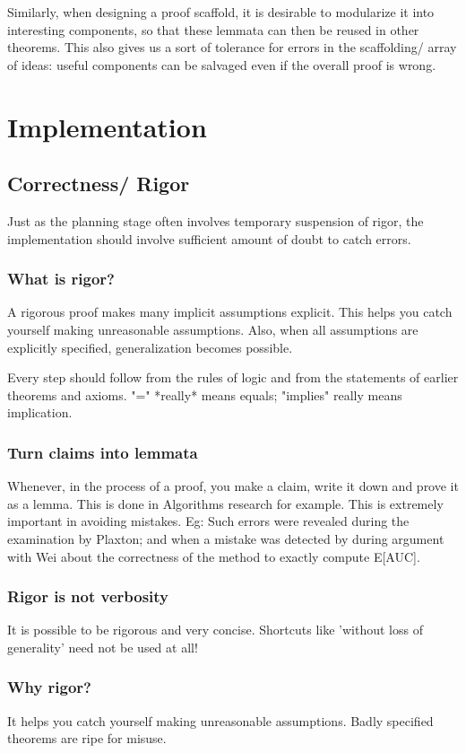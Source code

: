 \documentclass[oneside, article]{memoir}
\begin{document}
Similarly, when designing a proof scaffold, it is desirable to modularize it into interesting components, so that these lemmata can then be reused in other theorems. This also gives us a sort of tolerance for errors in the scaffolding/ array of ideas: useful components can be salvaged even if the overall proof is wrong.

\section{Implementation}
\subsection{Correctness/ Rigor}
Just as the planning stage often involves temporary suspension of rigor, the implementation should involve sufficient amount of doubt to catch errors.

\subsubsection{What is rigor?}
A rigorous proof makes many implicit assumptions explicit. This helps you catch yourself making unreasonable assumptions. Also, when all assumptions are explicitly specified, generalization becomes possible.

Every step should follow from the rules of logic and from the statements of earlier theorems and axioms. "=" *really* means equals; "implies" really means implication.

\subsubsection{Turn claims into lemmata}
Whenever, in the process of a proof, you make a claim, write it down and prove it as a lemma. This is done in Algorithms research for example. This is extremely important in avoiding mistakes. Eg: Such errors were revealed during the examination by Plaxton; and when a mistake was detected by during argument with Wei about the correctness of the method to exactly compute E[AUC].

\subsubsection{Rigor is not verbosity}
It is possible to be rigorous and very concise. Shortcuts like 'without loss of generality' need not be used at all!

\subsubsection{Why rigor?}
It helps you catch yourself making unreasonable assumptions. Badly specified theorems are ripe for misuse.
\end{document}
